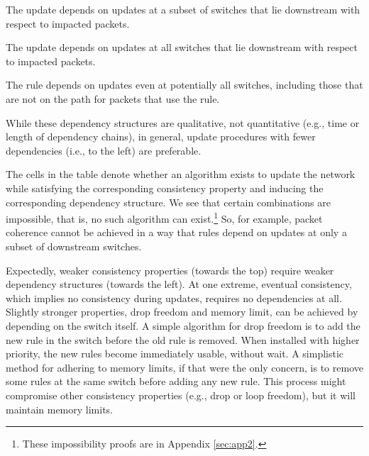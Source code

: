  The update depends on updates at a subset of switches that lie downstream with respect to impacted packets.

 The update depends on updates at all switches that lie downstream with respect to impacted packets.

 The rule depends on updates even at potentially all switches, including those that are not on the path for packets that use the rule.


While these dependency structures are qualitative, not quantitative (e.g., time or length of dependency chains), in general, update procedures with fewer dependencies (i.e., to the left) are preferable.


The cells in the table denote whether an algorithm exists to update the network while satisfying the corresponding consistency property and inducing the corresponding dependency structure. We see that certain combinations are impossible, that is, no such algorithm can exist.\footnote{These impossibility proofs are in Appendix \ref{sec:app2}.} So, for example, packet coherence cannot be achieved in a way that rules depend on updates at only a subset of downstream switches.

Expectedly, weaker consistency properties (towards the top) require weaker dependency structures (towards the left). At one extreme, eventual consistency, which implies no consistency during updates, requires no dependencies at all.  Slightly stronger properties, drop freedom and memory limit, can be achieved by depending on the switch itself. A simple algorithm for drop freedom is to add the new rule in the switch before the old rule is removed. When installed with higher priority, the new rules become immediately usable, without wait.
A simplistic method for adhering to memory limits, if that were the only concern, is to remove some rules at the same switch before adding any new rule. This process might compromise other consistency properties (e.g., drop or loop freedom), but it will maintain memory limits.

